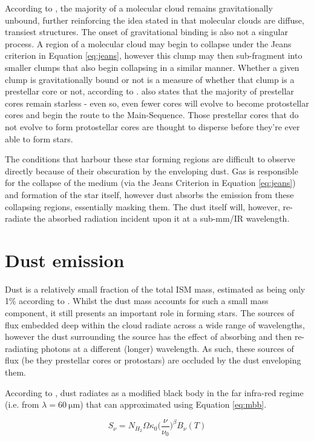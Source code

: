 \documentclass{report}
\begin{document}
According to \textcite{bound}, the majority of a molecular cloud remains gravitationally unbound, further reinforcing the idea stated in \textcite{evo-mol} that molecular clouds are diffuse, transiest structures. The onset of gravitational binding is also not a singular process. A region of a molecular cloud may begin to collapse under the Jeans criterion in Equation \ref{eq:jeans}, however this clump may then sub-fragment into smaller clumps that also begin collapsing in a similar manner. Whether a given clump is gravitationally bound or not is a measure of whether that clump is a prestellar core or not, according to \textcite{prestellar}. \textcite{prestellar} also states that the majority of prestellar cores remain starless - even so, even fewer cores will evolve to become protostellar cores and begin the route to the Main-Sequence. Those prestellar cores that do not evolve to form protostellar cores are thought to disperse before they're ever able to form stars.

The conditions that harbour these star forming regions are difficult to observe directly because of their obscuration by the enveloping dust. Gas is responsible for the collapse of the medium (via the Jeans Criterion in Equation \ref{eq:jeans}) and formation of the star itself, however dust absorbs the emission from these collapsing regions, essentially masking them. The dust itself will, however, re-radiate the absorbed radiation incident upon it at a sub-mm/IR wavelength.

\section{Dust emission}
Dust is a relatively small fraction of the total ISM mass, estimated as being only 1\% according to \textcite{noise}. Whilst the dust mass accounts for such a small mass component, it still presents an important role in forming stars. The sources of flux embedded deep within the cloud radiate across a wide range of wavelengths, however the dust surrounding the source has the effect of absorbing and then re-radiating photons at a different (longer) wavelength. As such, these sources of flux (be they prestellar cores or protostars) are occluded by the dust enveloping them.

According to \textcite{dustopacity}, dust radiates as a modified black body in the far infra-red regime (i.e. from $\lambda=\SI{60}{\micro\meter}$) that can approximated using Equation \ref{eq:mbb}.

\begin{equation}
  S_{\nu} = N_{H_{2}} \Omega \kappa_{0} \Big(\frac{\nu}{\nu_{0}}\Big)^{\beta} B_{\nu}(T)
   \label{eq:mbb}
\end{equation}
\end{document}
